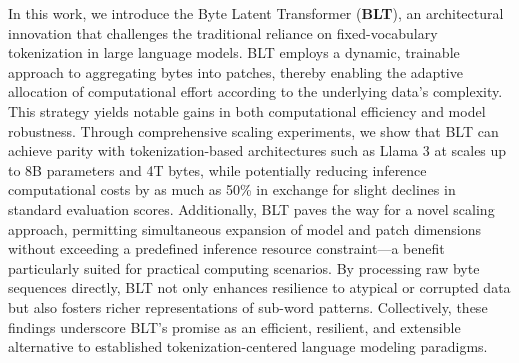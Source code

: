 In this work, we introduce the Byte Latent Transformer (\textbf{BLT}), an architectural innovation that challenges the traditional reliance on fixed-vocabulary tokenization in large language models. {\textsc BLT} employs a dynamic, trainable approach to aggregating bytes into patches, thereby enabling the adaptive allocation of computational effort according to the underlying data's complexity. This strategy yields notable gains in both computational efficiency and model robustness. Through comprehensive scaling experiments, we show that {\textsc BLT} can achieve parity with tokenization-based architectures such as Llama 3 at scales up to 8B parameters and 4T bytes, while potentially reducing inference computational costs by as much as 50\% in exchange for slight declines in standard evaluation scores. Additionally, {\textsc BLT} paves the way for a novel scaling approach, permitting simultaneous expansion of model and patch dimensions without exceeding a predefined inference resource constraint—a benefit particularly suited for practical computing scenarios. By processing raw byte sequences directly, {\textsc BLT} not only enhances resilience to atypical or corrupted data but also fosters richer representations of sub-word patterns. Collectively, these findings underscore {\textsc BLT}'s promise as an efficient, resilient, and extensible alternative to established tokenization-centered language modeling paradigms.

